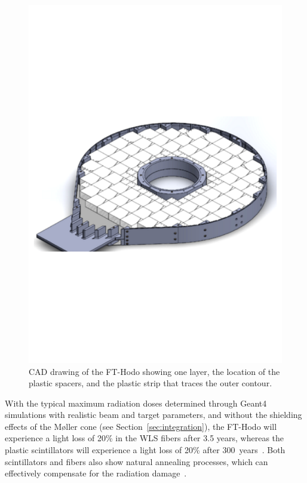 \begin{figure}[th!]
\centering 
\includegraphics[width=0.85\columnwidth]{./fig/CADFT-Hodo.pdf} 
\caption{CAD drawing of the FT-Hodo showing one layer, the location of the plastic spacers, and the plastic
  strip that traces the outer contour. } 
\label{Fig:CADFT-Hodo} 
\end{figure}

With the typical maximum radiation doses determined through Geant4 simulations with realistic beam and target
parameters, and without the shielding effects of the M{\o}ller cone (see Section~\ref{sec:integration}), the
FT-Hodo will experience a light loss of 20\% in the WLS fibers after 3.5 years, whereas the plastic scintillators will
experience a light loss of 20\% after 300~years~\cite{ft-tdr}. Both scintillators and fibers also show natural
annealing processes, which can effectively compensate for the radiation damage~\cite{ft-tdr}.  


